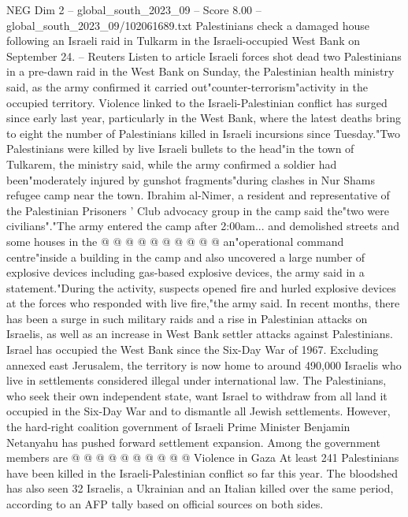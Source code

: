 \begin{textsample}{NEG Dim 2 – global\_south\_2023\_09 – Score 8.00 – global\_south\_2023\_09/102061689.txt}  \label{ex:f2_neg_006}
Palestinians check a damaged house following an Israeli raid in Tulkarm in the Israeli-occupied West Bank on September 24. -- Reuters Listen to article Israeli forces shot dead two Palestinians in a pre-dawn raid in the West Bank on Sunday, the Palestinian health ministry said, as the army confirmed it carried out"counter-terrorism"activity in the occupied territory.
Violence linked to the Israeli-Palestinian conflict has surged since early last year, particularly in the West Bank, where the latest deaths bring to eight the number of Palestinians killed in Israeli incursions since Tuesday."Two Palestinians were killed by live Israeli bullets to the head"in the town of Tulkarem, the ministry said, while the army confirmed a soldier had been"moderately injured by gunshot fragments"during clashes in Nur Shams refugee camp near the town.
Ibrahim al-Nimer, a resident and representative of the Palestinian Prisoners ' Club advocacy group in the camp said the"two were civilians"."The army entered the camp after 2:00am... and demolished streets and some houses in the @ @ @ @ @ @ @ @ @ @ an"operational command centre"inside a building in the camp and also uncovered a large number of explosive devices including gas-based explosive devices, the army said in a statement."During the activity, suspects opened fire and hurled explosive devices at the forces who responded with live fire,"the army said.
In recent months, there has been a surge in such military raids and a rise in Palestinian attacks on Israelis, as well as an increase in West Bank settler attacks against Palestinians.
Israel has occupied the West Bank since the Six-Day War of 1967.
Excluding annexed east Jerusalem, the territory is now home to around 490,000 Israelis who live in settlements considered illegal under international law.
The Palestinians, who seek their own independent state, want Israel to withdraw from all land it occupied in the Six-Day War and to dismantle all Jewish settlements.
However, the hard-right coalition government of Israeli Prime Minister Benjamin Netanyahu has pushed forward settlement expansion.
Among the government members are @ @ @ @ @ @ @ @ @ @ Violence in Gaza At least 241 Palestinians have been killed in the Israeli-Palestinian conflict so far this year.
The bloodshed has also seen 32 Israelis, a Ukrainian and an Italian killed over the same period, according to an AFP tally based on official sources on both sides.

\end{textsample}

